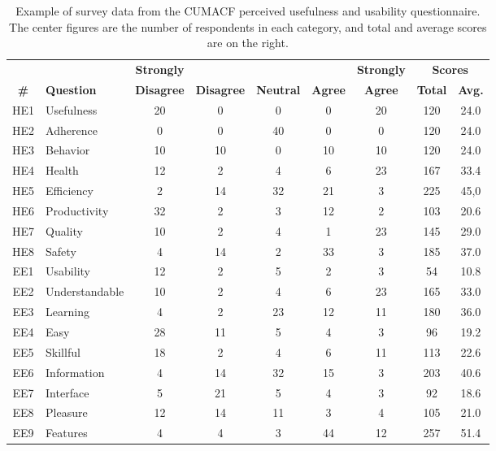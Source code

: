 \begin{table}[htp]
\caption{Example of survey data from the \ac{CUMACF} perceived usefulness and usability questionnaire. The center figures are the number of respondents in each category, and total and average scores are on the right.}
\centering
\scriptsize
\begin{tabular}{|c p{2.0cm}| c c c c c | c c|}
\toprule
\hline
\textbf{}	& \textbf{} &	\textbf{Strongly} &	\textbf{} &	\textbf{} &	\textbf{}  &	\textbf{Strongly}  &	\multicolumn{2}{c|}{\textbf{Scores}} \\
\textbf{\#}	& \textbf{Question} &	\textbf{Disagree} &	\textbf{Disagree} &	\textbf{Neutral} &	\textbf{Agree}  &	\textbf{Agree}  &	\textbf{Total}  &	\textbf{Avg.} \\
\hline
\hline
HE1	& Usefulness    &	20 & 	 0 & 	 0 & 	 0 & 	20 & 	120 &	24.0\\
HE2	& Adherence     &	 0 & 	 0 & 	40 & 	 0 & 	 0 & 	120 &	24.0\\
HE3	&Behavior       &	10 & 	10 & 	 0 & 	10 & 	10 & 	120 &	24.0\\
HE4	& Health        &	12 & 	 2 & 	 4 & 	 6 &	23 & 	167 &	33.4\\
HE5	& Efficiency    &	 2 & 	14 &	32 & 	21 & 	 3 &	225 &	45,0\\
HE6	& Productivity  &	32 & 	 2 & 	 3 &	12 & 	 2 & 	103 &   20.6\\
HE7	& Quality       &	10 & 	 2 & 	 4 &	 1 & 	23 &	145 &	29.0\\
HE8	& Safety        &	 4 &	14 &     2 & 	33 & 	 3 & 	185 &   37.0\\
\hline
EE1	& Usability     &	12 & 	 2 & 	 5 &	 2 & 	 3 &	 54 &	10.8\\
EE2	& Understandable &	10 & 	 2 & 	 4 & 	 6 &	23 & 	165 &	33.0\\
EE3	& Learning      &	 4 &	 2 & 	23 &    12 & 	11 & 	180 &	36.0\\
EE4	& Easy          &	28 &	11 & 	 5 &	 4 &	 3 &	 96 &	19.2\\
EE5	& Skillful      &	18 &	 2 & 	 4 &	 6 &	11 & 	113 &	22.6\\
EE6	& Information   &    4 &	14 &    32 & 	15 &	 3 &	203 &   40.6\\
EE7	& Interface     &	 5 &	21 & 	 5 &	 4 &	 3 &	 92 &	18.6\\
EE8	& Pleasure      &	12 &	14 &	11 &	 3 &	 4 &	105 &	21.0\\
EE9	& Features      & 	 4 &	 4 &     3 &	44 &	12 &	257 &   51.4\\
\hline
\bottomrule
\end{tabular}
\label{tab:survey}
\end{table}

